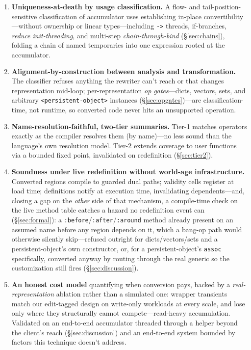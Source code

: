 \documentclass[sigplan,review,anonymous]{acmart}
\begin{document}
\begin{enumerate}
    \item \textbf{Uniqueness-at-death by usage classification.} A flow- and tail-position-sensitive classification of accumulator uses establishing in-place convertibility---without ownership or linear types---including \texttt{->} threads, if-branches, \emph{reduce init-threading}, and multi-step \emph{chain-through-bind} (§\ref{sec:chains}), folding a chain of named temporaries into one expression rooted at the accumulator.
    \item \textbf{Alignment-by-construction between analysis and transformation.} The classifier refuses anything the rewriter can't reach or that changes representation mid-loop; per-representation \emph{op gates}---dicts, vectors, sets, and arbitrary \texttt{<persistent-object>} instances (§\ref{sec:opgates})---are classification-time, not runtime, so converted code never hits an unsupported operation.
    \item \textbf{Name-resolution-faithful, two-tier summaries.} Tier-1 matches operators exactly as the compiler resolves them (by name)---no less sound than the language's own resolution model. Tier-2 extends coverage to user functions via a bounded fixed point, invalidated on redefinition (§\ref{sec:tier2}).
    \item \textbf{Soundness under live redefinition without world-age infrastructure.} Converted regions compile to guarded dual paths; validity cells register at load time; definitions notify at execution time, invalidating dependents---and, closing a gap on the \emph{other} side of that mechanism, a compile-time check on the live method table catches a hazard no redefinition event can (§\ref{sec:formal}): a \texttt{:before}/\texttt{:after}/\texttt{:around} method already present on an assumed name before any region depends on it, which a bang-op path would otherwise silently skip---refused outright for dicts/vectors/sets and a persistent-object's own constructor, or, for a persistent-object's \texttt{assoc} specifically, converted anyway by routing through the real generic so the customization still fires (§\ref{sec:discussion}).
    \item \textbf{An honest cost model} quantifying when conversion pays, backed by a \emph{real-representation} ablation rather than a simulated one: wrapper transients match our edit-tagged design on write-only workloads at every scale, and lose only where they structurally cannot compete---read-heavy accumulation. Validated on an end-to-end accumulator threaded through a helper beyond the client's reach (§\ref{sec:discussion}) and an end-to-end system bounded by factors this technique doesn't address.
\end{enumerate}
\end{document}
